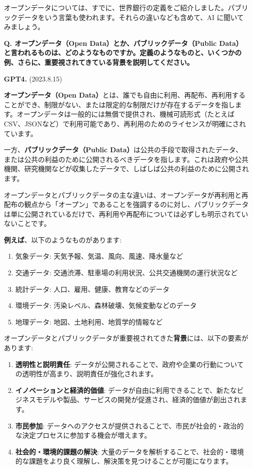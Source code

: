 \documentclass[
  xelatex, ja=standard]{bxjsbook}
\theoremstyle{definition}
\theoremstyle{definition}
\theoremstyle{definition}
\theoremstyle{definition}
\theoremstyle{remark}
\begin{document}
オープンデータについては、すでに、世界銀行の定義をご紹介しました。パブリックデータをいう言葉も使われます。それらの違いなども含めて、AI に聞いてみましょう。

\textbf{Q. オープンデータ（Open Data）とか、パブリックデータ（Public Data）と言われるものは、どのようなものですか。定義のようなものと、いくつかの例、さらに、重要視されてきている背景を説明してください。}

\textbf{GPT4.} (2023.8.15)

\textbf{オープンデータ（Open Data）}とは、誰でも自由に利用、再配布、再利用することができ、制限がない、または限定的な制限だけが存在するデータを指します。オープンデータは一般的には無償で提供され、機械可読形式（たとえばCSV、JSONなど）で利用可能であり、再利用のためのライセンスが明確にされています。

一方、\textbf{パブリックデータ（Public Data）}は公共の手段で取得されたデータ、または公共の利益のために公開されるべきデータを指します。これは政府や公共機関、研究機関などが収集したデータで、しばしば公共の利益のために公開されます。

オープンデータとパブリックデータの主な違いは、オープンデータが再利用と再配布の観点から「オープン」であることを強調するのに対し、パブリックデータは単に公開されているだけで、再利用や再配布については必ずしも明示されていないことです。

\textbf{例えば}、以下のようなものがあります:

\begin{enumerate}
\def\labelenumi{\arabic{enumi}.}
\item
  気象データ: 天気予報、気温、風向、風速、降水量など
\item
  交通データ: 交通渋滞、駐車場の利用状況、公共交通機関の運行状況など
\item
  統計データ: 人口、雇用、健康、教育などのデータ
\item
  環境データ: 汚染レベル、森林破壊、気候変動などのデータ
\item
  地理データ: 地図、土地利用、地質学的情報など
\end{enumerate}

オープンデータとパブリックデータが重要視されてきた\textbf{背景}には、以下の要素があります:

\begin{enumerate}
\def\labelenumi{\arabic{enumi}.}
\item
  \textbf{透明性と説明責任}: データが公開されることで、政府や企業の行動についての透明性が高まり、説明責任が強化されます。
\item
  \textbf{イノベーションと経済的価値}: データが自由に利用できることで、新たなビジネスモデルや製品、サービスの開発が促進され、経済的価値が創出されます。
\item
  \textbf{市民参加}: データへのアクセスが提供されることで、市民が社会的・政治的な決定プロセスに参加する機会が増えます。
\item
  \textbf{社会的・環境的課題の解決}: 大量のデータを解析することで、社会的・環境的な課題をより良く理解し、解決策を見つけることが可能になります。
\end{enumerate}
\end{document}

